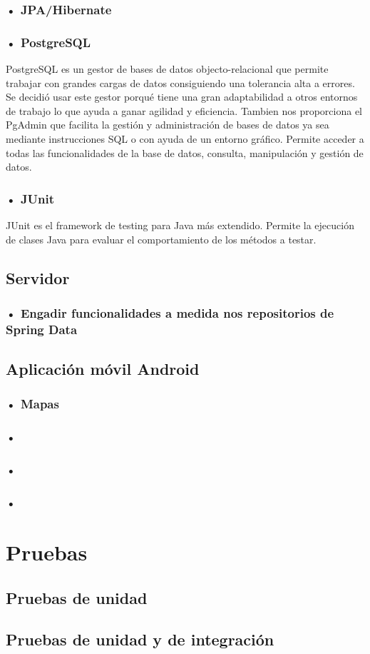 \subsubsection{• JPA/Hibernate}
\subsubsection{• PostgreSQL}

PostgreSQL es un gestor de bases de datos objecto-relacional  que permite trabajar con grandes cargas de datos consiguiendo una tolerancia alta a errores.
Se decidió usar este gestor porqué tiene una gran adaptabilidad a otros entornos de trabajo lo que ayuda a ganar agilidad y eficiencia. Tambien nos proporciona  el PgAdmin que facilita la gestión y administración de bases de datos ya sea mediante instrucciones SQL o con ayuda de un entorno gráfico. Permite acceder a todas las funcionalidades de la base de datos, consulta, manipulación y gestión de datos.
\subsubsection{• JUnit}

JUnit es el framework de testing para Java más extendido.
Permite la ejecución de clases Java para evaluar el comportamiento de los métodos a testar.



\subsection{Servidor}
\subsubsection{• Engadir funcionalidades a medida nos repositorios de Spring Data}
\subsection{Aplicación móvil Android}
\subsubsection{• Mapas}
\subsubsection{•}
\subsubsection{•}
\subsubsection{•}
\section{Pruebas}
\subsection{Pruebas de unidad}
\subsection{Pruebas de unidad y de integración}


